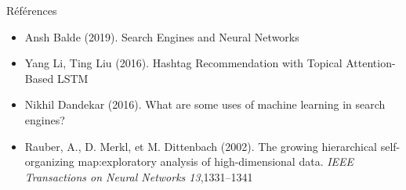 \documentclass[xelatex,12pt]{beamer}
\begin{document}
\begin{frame}{Références}
  \begin{itemize}
    \item Ansh Balde (2019). Search Engines and Neural Networks
    \item Yang Li, Ting Liu (2016). Hashtag Recommendation with Topical Attention-Based LSTM
    \item Nikhil Dandekar (2016). What are some uses of machine learning in search engines?
    \item Rauber, A., D. Merkl, et M. Dittenbach (2002). The growing hierarchical self-organizing map:exploratory analysis of high-dimensional data. \textit{IEEE Transactions on Neural Networks 13},1331–1341
  \end{itemize}
\end{frame}
\end{document}
